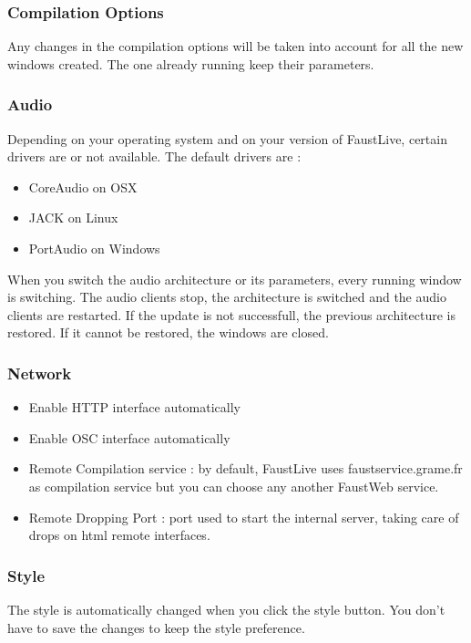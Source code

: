 \documentclass[a4paper]{article}
\begin{document}
\subsubsection{Compilation Options}
Any changes in the compilation options will be taken into account for all the new windows created. The one already running keep their parameters.
\subsubsection{Audio}
 
Depending on your operating system and on your version of FaustLive, certain drivers are or not available.
The default drivers are :
\begin{itemize}
\item CoreAudio on OSX
\item JACK on Linux
\item PortAudio on Windows
\end{itemize}

When you switch the audio architecture or its parameters, every running window is switching. The audio clients stop, the architecture is switched and the audio clients are restarted. If the update is not successfull, the previous architecture is restored. If it cannot be restored, the windows are closed. 

\subsubsection{Network}
\begin{itemize}
\item Enable HTTP interface automatically
\item Enable OSC interface automatically
\item Remote Compilation service : by default, FaustLive uses faustservice.grame.fr as compilation service but you can choose any another FaustWeb service.
\item Remote Dropping Port : port used to start the internal server, taking care of drops on html remote interfaces.

\end{itemize}

\subsubsection{Style}
The style is automatically changed when you click the style button. You don't have to save the changes to keep the style preference. 

%
\end{document}
